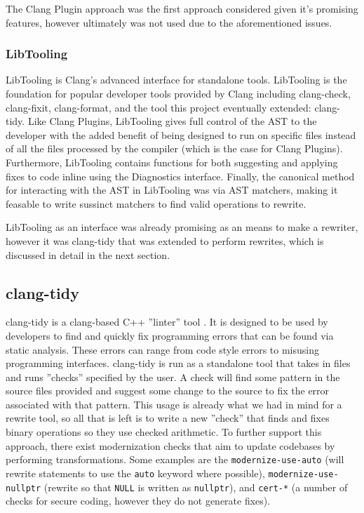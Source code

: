 The Clang Plugin approach was the first approach considered given it's promising features, however ultimately was not used due to the aforementioned issues.

\subsubsection{LibTooling}

LibTooling is Clang's advanced interface for standalone tools. LibTooling is the foundation for popular developer tools provided by Clang including clang-check, clang-fixit, clang-format, and the tool this project eventually extended: clang-tidy. Like Clang Plugins, LibTooling gives full control of the AST to the developer with the added benefit of being designed to run on specific files instead of all the files processed by the compiler (which is the case for Clang Plugins). Furthermore, LibTooling contains functions for both suggesting and applying fixes to code inline using the Diagnostics interface. Finally, the canonical method for interacting with the AST in LibTooling was via AST matchers, making it feasable to write sussinct matchers to find valid operations to rewrite.

LibTooling as an interface was already promising as an means to make a rewriter, however it was clang-tidy that was extended to perform rewrites, which is discussed in detail in the next section.

\subsection{clang-tidy}

clang-tidy is a clang-based C++ ''linter'' tool \cite{clang-tidy}. It is designed to be used by developers to find and quickly fix programming errors that can be found via static analysis. These errors can range from code style errors to misusing programming interfaces. clang-tidy is run as a standalone tool that takes in files and runs ''checks'' specified by the user. A check will find some pattern in the source files provided and suggest some change to the source to fix the error associated with that pattern. This usage is already what we had in mind for a rewrite tool, so all that is left is to write a new ''check'' that finds and fixes binary operations so they use checked arithmetic. To further support this approach, there exist modernization checks that aim to update codebases by performing transformations. Some examples are the \texttt{modernize-use-auto} (will rewrite statements to use the \texttt{auto} keyword where possible), \texttt{modernize-use-nullptr} (rewrite so that \texttt{NULL} is written as \texttt{nullptr}), and \texttt{cert-*} (a number of checks for secure coding, however they do not generate fixes).

